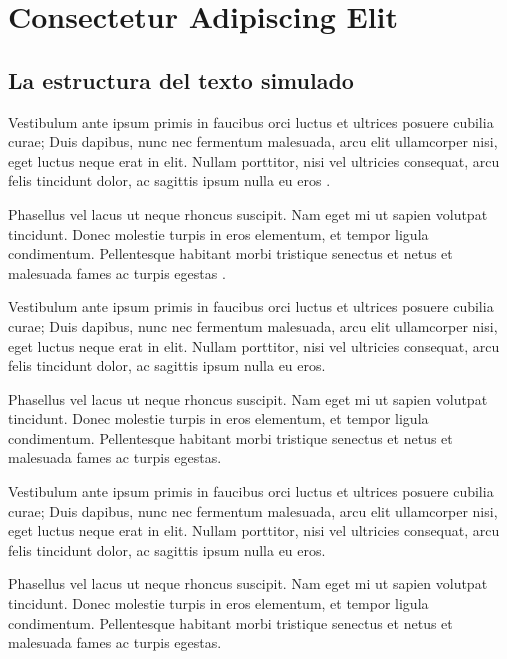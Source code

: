 \chapter{Consectetur Adipiscing Elit}
\setcounter{PrimPag}{\theCurrentPage}

\section{La estructura del texto simulado}

Vestibulum ante ipsum primis in faucibus orci luctus et ultrices posuere cubilia curae; Duis dapibus, nunc nec fermentum malesuada, arcu elit ullamcorper nisi, eget luctus neque erat in elit. Nullam porttitor, nisi vel ultricies consequat, arcu felis tincidunt dolor, ac sagittis ipsum nulla eu eros \parencite[2430]{@6773-ESTEVEZ1993}.

Phasellus vel lacus ut neque rhoncus suscipit. Nam eget mi ut sapien volutpat tincidunt. Donec molestie turpis in eros elementum, et tempor ligula condimentum. Pellentesque habitant morbi tristique senectus et netus et malesuada fames ac turpis egestas \parencite{@6592-ALAIN2017}.

Vestibulum ante ipsum primis in faucibus orci luctus et ultrices posuere cubilia curae; Duis dapibus, nunc nec fermentum malesuada, arcu elit ullamcorper nisi, eget luctus neque erat in elit. Nullam porttitor, nisi vel ultricies consequat, arcu felis tincidunt dolor, ac sagittis ipsum nulla eu eros.

Phasellus vel lacus ut neque rhoncus suscipit. Nam eget mi ut sapien volutpat tincidunt. Donec molestie turpis in eros elementum, et tempor ligula condimentum. Pellentesque habitant morbi tristique senectus et netus et malesuada fames ac turpis egestas.

Vestibulum ante ipsum primis in faucibus orci luctus et ultrices posuere cubilia curae; Duis dapibus, nunc nec fermentum malesuada, arcu elit ullamcorper nisi, eget luctus neque erat in elit. Nullam porttitor, nisi vel ultricies consequat, arcu felis tincidunt dolor, ac sagittis ipsum nulla eu eros.

Phasellus vel lacus ut neque rhoncus suscipit. Nam eget mi ut sapien volutpat tincidunt. Donec molestie turpis in eros elementum, et tempor ligula condimentum. Pellentesque habitant morbi tristique senectus et netus et malesuada fames ac turpis egestas.

